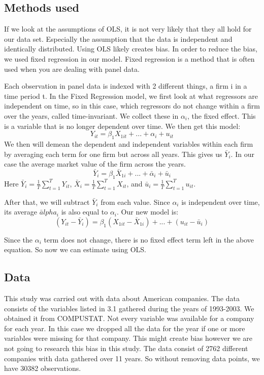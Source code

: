 \documentclass[11pt, letterpaper]{article}
\begin{document}
\subsection{Methods used}
If we look at the assumptions of OLS, it is not very likely that they all hold for our data set. Especially the assumption that the data is independent and identically distributed. Using OLS likely creates bias. In order to reduce the bias, we used fixed regression in our model. Fixed regression is a method that is often used when you are dealing with panel data. 

Each observation in panel data is indexed with 2 different things, a firm i in a time period t. In the Fixed Regression model, we first look at what regressors are independent on time, so in this case, which regressors do not change within a firm over the years, called time-invariant. We collect these in $\alpha_i$, the fixed effect. This is a variable that is no longer dependent over time. We then get this model:
\[Y_{it}=\beta_1X_{1it}+ ... + \alpha_i +u_{it}\] 
We then will demean the dependent and independent variables within each firm by averaging each term for one firm but across all years. This gives us $\bar Y_i$. In our case the average market value of the firm across the years. \[\bar Y_i=\beta_1 \bar X_{1i}+... +\bar \alpha_i +\bar u_i\]
Here $\bar Y_i= \frac{1}{T} \sum_{t=1}^T Y_{it}$, \quad $\bar X_i = \frac{1}{T}\sum_{t=1}^T X_{it}$, and \quad $\bar u_i= \frac{1}{T} \sum_{t=1}^T u_{it}$.

After that, we will subtract $\bar Y_i$ from each value. Since $\alpha_i$ is independent over time, its average $\bar alpha_i$ is also equal to $\alpha_i$. Our new model is:
\[(Y_{it}-\bar Y_i)=\beta_1(X_{1it}- \bar X_{1i})+ ...  +(u_{it}- \bar u_i)\]

Since the $\alpha_i$ term does not change, there is no fixed effect term left in the above equation. So now we can estimate using OLS.

\subsection{Data}
This study was carried out with data about American companies. The data consists of the variables listed in 3.1 gathered during the years of 1993-2003. We obtained it from COMPUSTAT. Not every variable was available for a company for each year. In this case we dropped all the data for the year if one or more variables were missing for that company. This might create bias however we are not going to research this bias in this study. The data consist of 2762 different companies with data gathered over 11 years. So without removing data points, we have 30382 observations.
\end{document}
